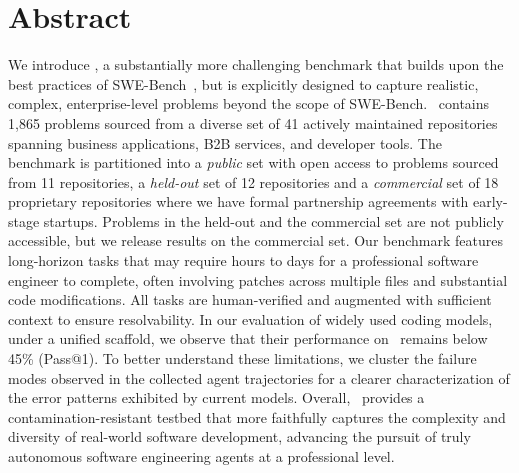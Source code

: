 \section*{Abstract}
We introduce \benchmarkname, a substantially more challenging benchmark that builds upon the best practices of SWE-Bench~\cite{zhang2025swebench}, but is explicitly designed to capture realistic, complex, enterprise-level problems beyond the scope of SWE-Bench.
\benchmarkname~contains 1,865 problems sourced from a diverse set of 41 actively maintained repositories spanning business applications, B2B services, and developer tools. The benchmark is partitioned into a \emph{public} set with open access to problems sourced from 11 repositories, a \emph{held-out} set of 12 repositories and a \emph{commercial} set of 18 proprietary repositories where we have formal partnership agreements with early-stage startups. Problems in the held-out and the commercial set are not publicly accessible, but we release results on the commercial set.
Our benchmark features long-horizon tasks that may require hours to days for a professional software engineer to complete, often involving patches across multiple files and substantial code modifications. All tasks are human-verified and augmented with sufficient context to ensure resolvability. In our evaluation of widely used coding models, under a unified scaffold, we observe that their performance on \benchmarkname~remains below 45\% (Pass@1). To better understand these limitations, we cluster the failure modes observed in the collected agent trajectories for a clearer characterization of the error patterns exhibited by current models. Overall, \benchmarkname~provides a contamination-resistant testbed that more faithfully captures the complexity and diversity of real-world software development, advancing the pursuit of truly autonomous software engineering agents at a professional level. 


